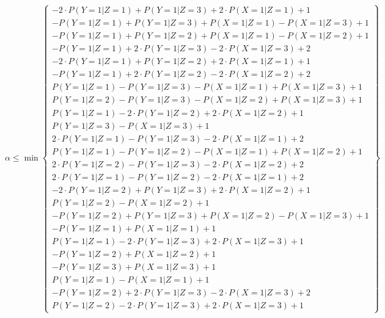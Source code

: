 \documentclass[
]{article}
\theoremstyle{plain}
\begin{document}
\[
\alpha \le \min
\begin{Bmatrix}
-2\cdot P(Y = 1 | Z = 1) +  P(Y = 1 | Z = 3) +  2\cdot P(X = 1 | Z = 1) + 1 \\
-P(Y = 1 | Z = 1) +  P(Y = 1 | Z = 3) +  P(X = 1 | Z = 1)-P(X = 1 | Z = 3) + 1 \\
-P(Y = 1 | Z = 1) +  P(Y = 1 | Z = 2) +  P(X = 1 | Z = 1)-P(X = 1 | Z = 2) + 1 \\
-P(Y = 1 | Z = 1) +  2\cdot P(Y = 1 | Z = 3)-2\cdot P(X = 1 | Z = 3) + 2 \\
-2\cdot P(Y = 1 | Z = 1) +  P(Y = 1 | Z = 2) +  2\cdot P(X = 1 | Z = 1) + 1 \\
-P(Y = 1 | Z = 1) +  2\cdot P(Y = 1 | Z = 2)-2\cdot P(X = 1 | Z = 2) + 2 \\
P(Y = 1 | Z = 1)-P(Y = 1 | Z = 3)-P(X = 1 | Z = 1) +  P(X = 1 | Z = 3) + 1 \\
 P(Y = 1 | Z = 2)-P(Y = 1 | Z = 3)-P(X = 1 | Z = 2) +  P(X = 1 | Z = 3) + 1 \\
P(Y = 1 | Z = 1)-2\cdot P(Y = 1 | Z = 2) +  2\cdot P(X = 1 | Z = 2) + 1 \\
 P(Y = 1 | Z = 3)-P(X = 1 | Z = 3) + 1 \\
2\cdot P(Y = 1 | Z = 1)-P(Y = 1 | Z = 3)-2\cdot P(X = 1 | Z = 1) + 2 \\
P(Y = 1 | Z = 1)-P(Y = 1 | Z = 2)-P(X = 1 | Z = 1) +  P(X = 1 | Z = 2) + 1 \\
 2\cdot P(Y = 1 | Z = 2)-P(Y = 1 | Z = 3)-2\cdot P(X = 1 | Z = 2) + 2 \\
2\cdot P(Y = 1 | Z = 1)-P(Y = 1 | Z = 2)-2\cdot P(X = 1 | Z = 1) + 2 \\
-2\cdot P(Y = 1 | Z = 2) +  P(Y = 1 | Z = 3) +  2\cdot P(X = 1 | Z = 2) + 1 \\
 P(Y = 1 | Z = 2)-P(X = 1 | Z = 2) + 1 \\
-P(Y = 1 | Z = 2) +  P(Y = 1 | Z = 3) +  P(X = 1 | Z = 2)-P(X = 1 | Z = 3) + 1 \\
-P(Y = 1 | Z = 1) +  P(X = 1 | Z = 1) + 1 \\
P(Y = 1 | Z = 1)-2\cdot P(Y = 1 | Z = 3) +  2\cdot P(X = 1 | Z = 3) + 1 \\
-P(Y = 1 | Z = 2) +  P(X = 1 | Z = 2) + 1 \\
-P(Y = 1 | Z = 3) +  P(X = 1 | Z = 3) + 1 \\
P(Y = 1 | Z = 1)-P(X = 1 | Z = 1) + 1 \\
-P(Y = 1 | Z = 2) +  2\cdot P(Y = 1 | Z = 3)-2\cdot P(X = 1 | Z = 3) + 2 \\
 P(Y = 1 | Z = 2)-2\cdot P(Y = 1 | Z = 3) +  2\cdot P(X = 1 | Z = 3) + 1
\end{Bmatrix}
\]
\fi
\end{document}
